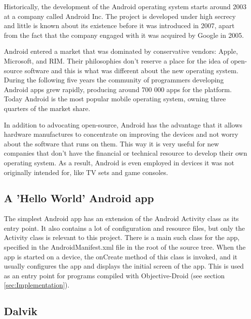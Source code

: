 \documentclass[parskip]{cs4rep}
\begin{document}
Historically, the development of the Android operating system starts around 2003 at a company called Android Inc\cite{BloombergBusinessweek2005}. The project is developed under high secrecy and little is known about its existence before it was introduced in 2007, apart from the fact that the company engaged with it was acquired by Google in 2005.

Android entered a market that was dominated by conservative vendors: Apple, Microsoft, and RIM. Their philosophies don't reserve a place for the idea of open-source software and this is what was different about the new operating system. During the following five years the community of programmers developing Android apps grew rapidly, producing around 700 000 apps for the platform\cite{Islam2012}. Today Android is the most popular mobile operating system, owning three quarters of the market share\cite{IDC2012}.

In addition to advocating open-source, Android has the advantage that it allows hardware manufactures to concentrate on improving the devices and not worry about the software that runs on them. This way it is very useful for new companies that don't have the financial or technical resource to develop their own operating system. As a result, Android is even employed in devices it was not originally intended for, like TV sets and game consoles\cite{Telecompaper2012}\cite{Etherington2013}.

\subsection{A 'Hello World' Android app} \label{sec:AndroidHelloWorld}

The simplest Android app has an extension of the Android Activity class as its entry point. It also contains a lot of configuration and resource files, but only the Activity class is relevant to this project. There is a main such class for the app, specified in the AndroidManifest.xml file in the root of the source tree. When the app is started on a device, the onCreate method of this class is invoked, and it usually configures the app and displays the initial screen of the app. This is used as an entry point for programs compiled with Objective-Droid (see section \ref{sec:Implementation}).

\subsection{Dalvik}
\end{document}

